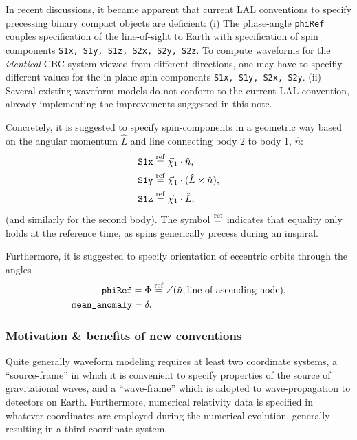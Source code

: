\documentclass[aps,prd,amssymb,amsmath,amsfonts,superscriptaddress,
floatfix ,preprintnumbers,altaffilletter]{revtex4}
\newcommand{\nNR}{\hat{n}}
\newcommand{\lNR}{\hat L}
\newcommand{\phiRef}{\Phi} %
\newcommand{\equalref}{\overset{\rm ref}{=}}
\begin{document}
In recent discussions, it became apparent that current LAL conventions
to specify precessing binary compact objects are deficient: (i) The
phase-angle {\tt phiRef} couples specification of the line-of-sight to
Earth with specification of spin components {\tt S1x, S1y, S1z, S2x,
  S2y, S2z}.  To compute waveforms for the \emph{identical} CBC system
viewed from different directions, one may have to specifiy different
values for the in-plane spin-components {\tt S1x, S1y, S2x, S2y}.
(ii) Several existing waveform models do not conform to the current
LAL convention, already implementing the improvements suggested in this note.

Concretely, it is suggested to specify spin-components in a geometric
way based on the angular momentum $\lNR$ and line connecting body 2 to
body 1, $\nNR$:
\begin{align}
  \mbox{\tt S1x}&\equalref \vec\chi_1\cdot\nNR,\\
  \mbox{\tt S1y}&\equalref \vec\chi_1\cdot (\lNR\times\nNR),\\
  \mbox{\tt S1z}&\equalref \vec\chi_1\cdot\lNR,
\end{align}
(and similarly for the second body).  The symbol $\equalref$ indicates
that equality only holds at the reference time, as spins generically
precess during an inspiral.

Furthermore, it is suggested to specify
orientation of eccentric orbits through the angles
\begin{align}
  \mbox{\tt phiRef} = \phiRef &\equalref \angle(\nNR, \mbox{line-of-ascending-node}),\\
  \mbox{\tt mean\_anomaly}= \delta.& %
  \end{align}


\subsubsection{Motivation \& benefits of new conventions}

Quite generally waveform modeling requires at least two coordinate
systems, a ``source-frame'' in which it is convenient to specify
properties of the source of gravitational waves, and a ``wave-frame''
which is adopted to wave-propagation to detectors on Earth.
Furthermore, numerical relativity data is specified in whatever
coordinates are employed during the numerical evolution, generally
resulting in a third coordinate system.
\end{document}
